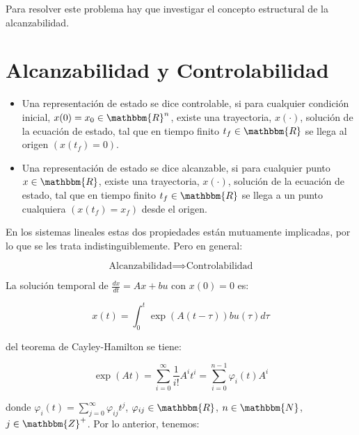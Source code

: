     Para resolver este problema hay que investigar el concepto estructural de la alcanzabilidad.

    \section{Alcanzabilidad y Controlabilidad}

        \begin{itemize}
            \item Una representación de estado se dice controlable, si para cualquier condición inicial, $x(0) = x_0 \in \mathbbm{R}^n$, existe una trayectoria, $x(\cdot)$, solución de la ecuación de estado, tal que en tiempo finito $t_f \in \mathbbm{R}$ se llega al origen $\left( x(t_f) = 0 \right)$.
            \item Una representación de estado se dice alcanzable, si para cualquier punto $x \in \mathbbm{R}$, existe una trayectoria, $x(\cdot)$, solución de la ecuación de estado, tal que en tiempo finito $t_f \in \mathbbm{R}$ se llega a un punto cualquiera $\left( x(t_f) = x_f \right)$ desde el origen.
        \end{itemize}

        En los sistemas lineales estas dos propiedades están mutuamente implicadas, por lo que se les trata indistinguiblemente. Pero en general:

        \begin{equation}
            \text{Alcanzabilidad} \implies \text{Controlabilidad}
        \end{equation}

        La solución temporal de $\frac{dx}{dt} = Ax + bu$ con $x(0) = 0$ es:

        \begin{equation}
            x(t) = \int_0^t \exp{(A(t - \tau))} b u(\tau) d \tau
        \end{equation}

        del teorema de Cayley-Hamilton se tiene:

        \begin{equation}
            \exp{(A t)} = \sum\limits_{i=0}^{\infty} \frac{1}{i!} A^i t^i = \sum\limits_{i=0}^{n-1} \varphi_i(t) A^i
        \end{equation}

        donde $\varphi_i(t) = \sum\limits_{j=0}^{\infty} \varphi_{ij} t^j$, $\varphi_{ij} \in \mathbbm{R}$, $n \in \mathbbm{N}$, $j \in \mathbbm{Z}^+$. Por lo anterior, tenemos:

